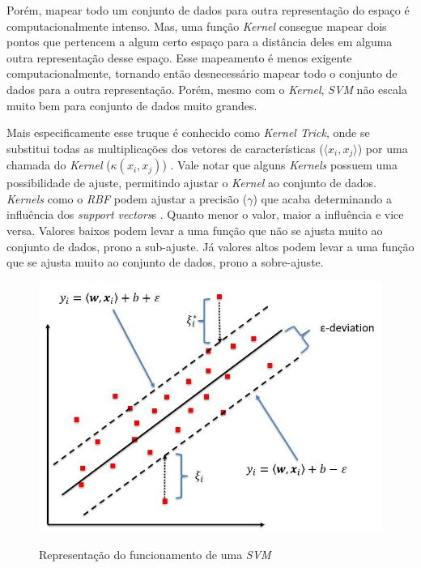 

Porém, mapear todo um conjunto de dados para outra representação do espaço é computacionalmente intenso. Mas, uma função \textit{Kernel} consegue mapear dois pontos que pertencem a algum certo espaço para a distância deles em alguma outra representação desse espaço. Esse mapeamento é menos exigente computacionalmente, tornando então desnecessário mapear todo o conjunto de dados para a outra representação. Porém, mesmo com o \textit{Kernel}, \textit{\acrshort{SVM}} não escala muito bem para conjunto de dados muito grandes. \cite{chollet2018deep}

Mais especificamente esse truque é conhecido como \textit{Kernel Trick}, onde se substitui todas as multiplicações dos vetores de características (\(\langle x_i, x_j \rangle\)) por uma chamada do \textit{Kernel} (\(\kappa(x_i, x_j)\)) \cite{murphy2012machine}. Vale notar que alguns \textit{Kernels} possuem uma possibilidade de ajuste, permitindo ajustar o \textit{Kernel} ao conjunto de dados. \textit{Kernels} como o \textit{\acrfull{RBF}} podem ajustar a precisão (\(\gamma\)) que acaba determinando a influência dos \textit{support vectors}s \cite{murphy2012machine}. Quanto menor o valor, maior a influência e vice versa. Valores baixos podem levar a uma função que não se ajusta muito ao conjunto de dados, prono a sub-ajuste. Já valores altos podem levar a uma função que se ajusta muito ao conjunto de dados, prono a sobre-ajuste.


\begin{figure}[htbp]
    \centering
    \includegraphics[scale=1.0]{monography/img/models/svr_example.png}
    \label{figure:support_vector_machine}
    \caption[Representação do funcionamento de uma \textit{\acrshort{SVM}}]{Representação do funcionamento de uma \textit{\acrshort{SVM}}\footnotemark}
\end{figure}

